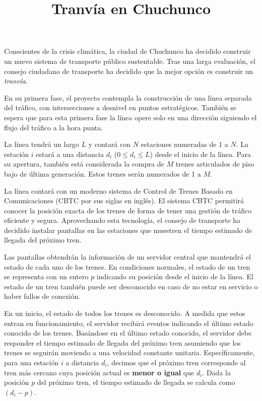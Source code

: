\documentclass{oci}
\title{Tranvía en Chuchunco}
\begin{document}
\begin{problemDescription}
  Conscientes de la crisis climática, la ciudad de Chuchunco
  ha decidido construir un nuevo sistema de transporte
  público sustentable.
  Tras una larga evaluación, el consejo ciudadano de
  transporte ha decidido que la mejor opción es construir un
  \emph{tranvía}.

  En su primera fase, el proyecto contempla la
  construcción de una línea separada del tráfico, con
  intersecciones a desnivel en puntos estratégicos.
  También se espera que para esta primera fase la línea
  opere solo en una dirección siguiendo el flujo del
  tráfico a la hora punta.

  La línea tendrá un largo $L$ y contará con $N$
  estaciones numeradas de 1 a $N$.
  La estación $i$ estará a una distancia $d_i$
  ($0 \leq d_i \leq L$) desde el inicio de la línea.
  Para su apertura, también está considerada la
  compra de $M$ trenes articulados de piso bajo
  de última generación.
  Estos trenes serán numerados de 1 a $M$.

  La línea contará con un moderno sistema de
  Control de Trenes Basado en Comunicaciones
  (CBTC por sus siglas en inglés).
  El sistema CBTC permitirá conocer la posición
  exacta de los trenes de forma de tener una
  gestión de tráfico eficiente y segura.
  Aprovechando esta tecnología, el consejo de
  transporte ha decidido instalar pantallas en las
  estaciones que muestren el tiempo estimado de
  llegada del próximo tren.

  Las pantallas obtendrán la información de un
  servidor central que mantendrá el estado
  de cada uno de los trenes.
  En condiciones normales, el estado de un tren
  se representa con un entero $p$ indicando
  su posición desde el inicio de la línea.
  El estado de un tren también puede ser desconocido
  en caso de no estar en servicio o haber fallos
  de conexión.

  En un inicio, el estado de todos los trenes es
  desconocido.
  A medida que estos entran en funcionamiento, el
  servidor recibirá eventos indicando el
  último estado conocido de los trenes.
  Basándose en el último estado conocido, el servidor
  debe responder el tiempo estimado de llegada del
  próximo tren asumiendo que los trenes se seguirán
  moviendo a una velocidad constante unitaria.
  Específicamente, para una estación $i$ a distancia $d_i$,
  decimos que el próximo tren corresponde al tren más cercano
  cuya posición actual es \textbf{menor o igual} que $d_i$.
  Dada la posición $p$ del próximo tren, el tiempo estimado
  de llegada se calcula como $(d_i - p)$.


\end{problemDescription}
\end{document}
